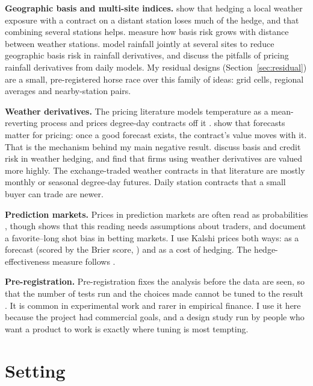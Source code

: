 \documentclass[11pt]{article}
\begin{document}
\textbf{Geographic basis and multi-site indices.} \citet{woodard2008} show that hedging a local weather exposure with a contract on a distant station loses much of the hedge, and that combining several stations helps. \citet{norton2013} measure how basis risk grows with distance between weather stations. \citet{ritter2014} model rainfall jointly at several sites to reduce geographic basis risk in rainfall derivatives, and \citet{odening2007} discuss the pitfalls of pricing rainfall derivatives from daily models. My residual designs (Section~\ref{sec:residual}) are a small, pre-registered horse race over this family of ideas: grid cells, regional averages and nearby-station pairs.

\textbf{Weather derivatives.} The pricing literature models temperature as a mean-reverting process and prices degree-day contracts off it \citep{alaton2002,caowei2004,jewson2005}. \citet{campbell2005} show that forecasts matter for pricing: once a good forecast exists, the contract's value moves with it. That is the mechanism behind my main negative result. \citet{golden2007} discuss basis and credit risk in weather hedging, and \citet{perezgonzalez2013} find that firms using weather derivatives are valued more highly. The exchange-traded weather contracts in that literature are mostly monthly or seasonal degree-day futures. Daily station contracts that a small buyer can trade are newer.

\textbf{Prediction markets.} Prices in prediction markets are often read as probabilities \citep{wolfers2004}, though \citet{manski2006} shows that this reading needs assumptions about traders, and \citet{snowberg2010} document a favorite--long shot bias in betting markets. I use Kalshi prices both ways: as a forecast (scored by the Brier score, \citealp{brier1950}) and as a cost of hedging. The hedge-effectiveness measure follows \citet{ederington1979}.

\textbf{Pre-registration.} Pre-registration fixes the analysis before the data are seen, so that the number of tests run and the choices made cannot be tuned to the result \citep{nosek2018}. It is common in experimental work and rarer in empirical finance. I use it here because the project had commercial goals, and a design study run by people who want a product to work is exactly where tuning is most tempting.

\section{Setting}
\label{sec:setting}
\end{document}
